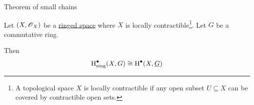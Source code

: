 \documentclass[../../main]{subfiles}
\begin{document}
\begin{theorem}\label{thm:small-chains}
  Theorem of small chains
\end{theorem}


\begin{theorem}\label{thm:singular-sheaf-cohomology}
  Let \((X, \mathscr{O}_{X})\) be a \hyperref[def:ringed-space]{ringed space} where \(X\) is locally contractible\footnote{A topological space \(X\) is locally contractible if any open subset \(U \subseteq X\) can be covered by contractible open sets.}.
  Let \(G\) be a commutative ring.

  Then
  \begin{equation*}
    \operatorname{H}^{\bullet}_{\operatorname{sing}}(X, G) \cong \operatorname{H}^{\bullet}(X, \underline{G})
  \end{equation*}
\end{theorem}
\end{document}

